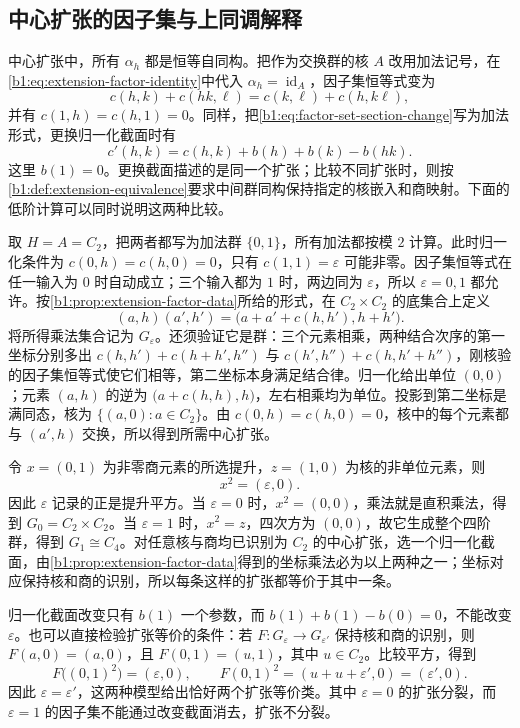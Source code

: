 \subsection{中心扩张的因子集与上同调解释}
\label{b1:subsec:0604:03}

中心扩张中，所有 \(\alpha_h\) 都是恒等自同构。把作为交换群的核 \(A\) 改用加法记号，在\eqref{b1:eq:extension-factor-identity}中代入 \(\alpha_h=\operatorname{id}_A\)，因子集恒等式变为
\[
	c(h,k)+c(hk,\ell)=c(k,\ell)+c(h,k\ell),
\]
并有 \(c(1,h)=c(h,1)=0\)。同样，把\eqref{b1:eq:factor-set-section-change}写为加法形式，更换归一化截面时有
\[
	c'(h,k)=c(h,k)+b(h)+b(k)-b(hk).
\]
这里 \(b(1)=0\)。更换截面描述的是同一个扩张；比较不同扩张时，则按\cref{b1:def:extension-equivalence}要求中间群同构保持指定的核嵌入和商映射。下面的低阶计算可以同时说明这两种比较。

\ProseParagraphBreak
取 \(H=A=C_2\)，把两者都写为加法群 \(\{0,1\}\)，所有加法都按模 \(2\) 计算。此时归一化条件为 \(c(0,h)=c(h,0)=0\)，只有 \(c(1,1)=\varepsilon\) 可能非零。因子集恒等式在任一输入为 \(0\) 时自动成立；三个输入都为 \(1\) 时，两边同为 \(\varepsilon\)，所以 \(\varepsilon=0,1\) 都允许。按\cref{b1:prop:extension-factor-data}所给的形式，在 \(C_2\times C_2\) 的底集合上定义
\[
	(a,h)(a',h')=\bigl(a+a'+c(h,h'),h+h'\bigr).
\]
将所得乘法集合记为 \(G_\varepsilon\)。还须验证它是群：三个元素相乘，两种结合次序的第一坐标分别多出 \(c(h,h')+c(h+h',h'')\) 与 \(c(h',h'')+c(h,h'+h'')\)，刚核验的因子集恒等式使它们相等，第二坐标本身满足结合律。归一化给出单位 \((0,0)\)；元素 \((a,h)\) 的逆为 \(\bigl(a+c(h,h),h\bigr)\)，左右相乘均为单位。投影到第二坐标是满同态，核为 \(\bigl\{(a,0):a\in C_2\bigr\}\)。由 \(c(0,h)=c(h,0)=0\)，核中的每个元素都与 \((a',h)\) 交换，所以得到所需中心扩张。

\ProseParagraphBreak
令 \(x=(0,1)\) 为非零商元素的所选提升，\(z=(1,0)\) 为核的非单位元素，则
\[
	x^2=(\varepsilon,0).
\]
因此 \(\varepsilon\) 记录的正是提升平方。当 \(\varepsilon=0\) 时，\(x^2=(0,0)\)，乘法就是直积乘法，得到 \(G_0=C_2\times C_2\)。当 \(\varepsilon=1\) 时，\(x^2=z\)，四次方为 \((0,0)\)，故它生成整个四阶群，得到 \(G_1\cong C_4\)。对任意核与商均已识别为 \(C_2\) 的中心扩张，选一个归一化截面，由\cref{b1:prop:extension-factor-data}得到的坐标乘法必为以上两种之一；坐标对应保持核和商的识别，所以每条这样的扩张都等价于其中一条。

\ProseParagraphBreak
归一化截面改变只有 \(b(1)\) 一个参数，而 \(b(1)+b(1)-b(0)=0\)，不能改变 \(\varepsilon\)。也可以直接检验扩张等价的条件：若 \(F:G_\varepsilon\rightarrow G_{\varepsilon'}\) 保持核和商的识别，则 \(F(a,0)=(a,0)\)，且 \(F(0,1)=(u,1)\)，其中 \(u\in C_2\)。比较平方，得到
\[
	F\bigl((0,1)^2\bigr)=(\varepsilon,0),\qquad F(0,1)^2=(u+u+\varepsilon',0)=(\varepsilon',0).
\]
因此 \(\varepsilon=\varepsilon'\)，这两种模型给出恰好两个扩张等价类。其中 \(\varepsilon=0\) 的扩张分裂，而 \(\varepsilon=1\) 的因子集不能通过改变截面消去，扩张不分裂。

